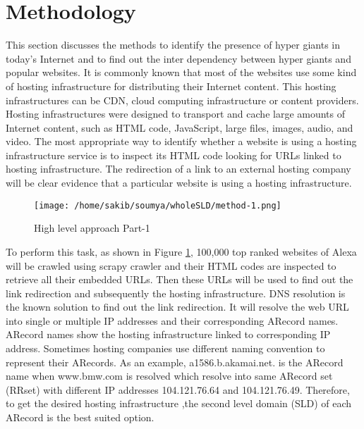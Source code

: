 \section{Methodology\label{cha:chapter3}}

\noindent This section discusses the methods to identify the presence of hyper giants in today's Internet and to find out the inter dependency between hyper giants and popular websites. It is commonly known that most of the websites use some kind of hosting infrastructure for distributing their Internet content. This hosting infrastructures can be CDN, cloud computing infrastructure or content providers. Hosting infrastructures were designed to transport and cache large amounts of Internet content, such as HTML code, JavaScript, large files, images, audio, and video. The most appropriate way to identify whether a website is using a hosting infrastructure service is to inspect its HTML code looking for URLs linked to hosting infrastructure. The redirection of a link to an external hosting company will be clear evidence that a particular website is using a hosting infrastructure. 

\begin{figure}[htb]
  \centering
  \texttt{[image: /home/sakib/soumya/wholeSLD/method-1.png]}\\
  \caption{High level approach Part-1}
  \label{fig:approach}
\end{figure}

\noindent To perform this task, as shown in Figure \ref{fig:approach}, 100,000 top ranked websites of Alexa \cite{alexa} will be crawled using scrapy crawler \cite{crawler} \cite{scrapy} and their HTML codes  are inspected to retrieve all their embedded URLs. Then these URLs will be used to find out the link redirection and subsequently the hosting infrastructure. DNS resolution is the known solution to find out the link redirection. It will resolve the web URL into single or multiple  IP addresses and their corresponding ARecord names. ARecord names show the hosting infrastructure linked to corresponding IP address. Sometimes hosting companies use different naming convention to represent their ARecords.
As an example, a1586.b.akamai.net. is the ARecord name when www.bmw.com is resolved  which resolve into same ARecord set (RRset) with different IP addresses 104.121.76.64 and 104.121.76.49. Therefore, to get the desired hosting infrastructure ,the second level domain (SLD) of each ARecord is the best suited option.\\

